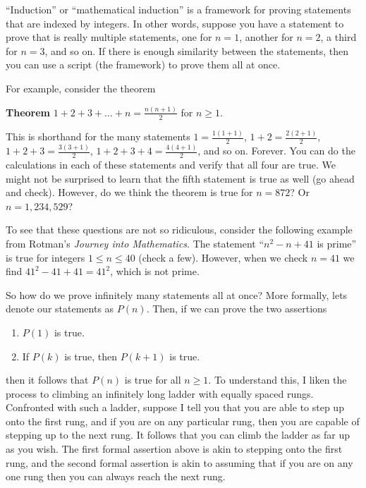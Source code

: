 ``Induction'' or ``mathematical induction'' is a framework for proving statements that are indexed by integers.  In other words, suppose you have a statement to prove that is really multiple statements, one for $n=1$, another for $n=2$, a third for $n=3$, and so on.  If there is enough similarity between the statements, then you can use a script (the framework) to prove them all at once.\par
%
For example, consider the theorem\par\medskip
%
{\bf Theorem}  $1+2+3+\dots+n=\displaystyle\frac{n(n+1)}{2}$ for $n\geq 1$.\par\medskip
%
This is shorthand for the many statements $1=\frac{1(1+1)}{2}$, $1+2=\frac{2(2+1)}{2}$, $1+2+3=\frac{3(3+1)}{2}$, $1+2+3+4=\frac{4(4+1)}{2}$, and so on.  Forever.  You can do the calculations in each of these statements and verify that all four are true.  We might not be surprised to learn that the fifth statement is true as well (go ahead and check).  However, do we think the theorem is true for $n=872$?  Or $n=1,234,529$?\par
%
To see that these questions are not so ridiculous, consider the following example from Rotman's {\sl Journey into Mathematics}.  The statement ``$n^{2}-n+41$ is prime'' is true for integers  $1\leq n\leq 40$ (check a few).  However, when we check $n=41$ we find $41^2-41+41=41^2$, which is not prime.\par
%
So how do we prove infinitely many statements all at once?  More formally, lets denote our statements as $P(n)$.  Then, if we can prove the two assertions
%
\begin{enumerate}
\item $P(1)$ is true.
\item If $P(k)$ is true, then $P(k+1)$ is true.
\end{enumerate}
%
then it follows that $P(n)$ is true for all $n\geq 1$.  To understand this, I liken the process to climbing an infinitely long ladder with equally spaced rungs.  Confronted with such a ladder, suppose I tell you that you are able to step up onto the first rung, and if you are on any particular rung, then you are capable of stepping up to the next rung.  It follows that you can climb the ladder as far up as you wish.  The first formal assertion above is akin to stepping onto the first rung, and the second formal assertion is akin to assuming that if you are on any one rung then you can always reach the next rung.\par
